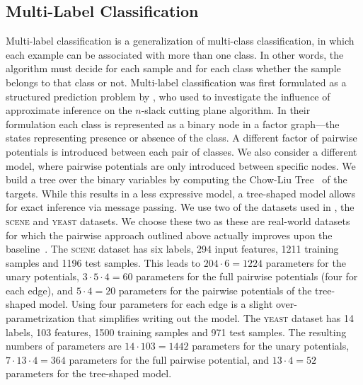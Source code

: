 \subsection{Multi-Label Classification}
Multi-label classification is a generalization of multi-class classification,
in which each example can be associated with more than one class. In other
words, the algorithm must decide for each sample and for each class whether the
sample belongs to that class or not.
Multi-label classification was first formulated as a structured prediction problem
by \citet{finley2008training}, who used to investigate the influence of
approximate inference on the $n$-slack cutting plane algorithm. In their formulation
each class is represented as a binary node in a factor graph---the states representing
presence or absence of the class. A different factor of pairwise potentials is introduced
between each pair of classes.
We also consider a different model, where pairwise potentials are only
introduced between specific nodes. We build a tree over the binary variables by
computing the Chow-Liu Tree~\citep{chow1968approximating} of the targets. While
this results in a less expressive model, a tree-shaped model allows for exact
inference via message passing.
We use two of the datasets used in \citet{finley2008training}, the \textsc{scene}
and \textsc{yeast} datasets. We choose these two as these are real-world datasets for
which the pairwise approach outlined above actually improves upon the
baseline~\citep{finley2008training}.
The \textsc{scene} dataset has six labels, 294 input features, 1211 training samples and
1196 test samples. This leads to $204 \cdot 6 = 1224$ parameters for the unary potentials,
$3 \cdot 5 \cdot 4 = 60$ parameters for the full pairwise potentials (four for each edge), and
$5 \cdot 4 = 20$ parameters for the pairwise potentials of the tree-shaped model.
Using four parameters for each edge is a slight over-parametrization that
simplifies writing out the model.
The \textsc{yeast} dataset has 14 labels, 103 features, 1500 training samples and 971
test samples. The resulting numbers of parameters are $14 \cdot 103=1442$ parameters
for the unary potentials, $7 \cdot 13 \cdot 4=364$ parameters for the full pairwise
potential, and $13 \cdot 4=52$ parameters for the tree-shaped model.

